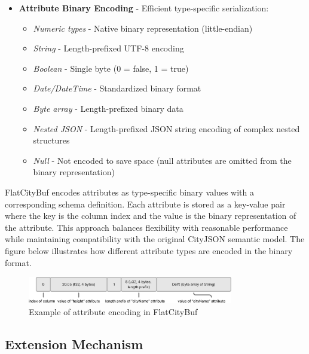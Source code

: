 \begin{itemize}
  \item \textbf{Attribute Binary Encoding} - Efficient type-specific serialization:
    \begin{itemize}
      \item \textit{Numeric types} - Native binary representation (little-endian)
      \item \textit{String} - Length-prefixed UTF-8 encoding
      \item \textit{Boolean} - Single byte (0 = false, 1 = true)
      \item \textit{Date/DateTime} - Standardized binary format
      \item \textit{Byte array} - Length-prefixed binary data
      \item \textit{Nested JSON} - Length-prefixed JSON string encoding of complex nested structures
      \item \textit{Null} - Not encoded to save space (null attributes are omitted from the binary representation)
    \end{itemize}
\end{itemize}

FlatCityBuf encodes attributes as type-specific binary values with a corresponding schema definition. Each attribute is stored as a key-value pair where the key is the column index and the value is the binary representation of the attribute. This approach balances flexibility with reasonable performance while maintaining compatibility with the original CityJSON semantic model. The figure below illustrates how different attribute types are encoded in the binary format.

\begin{figure}[htbp]
  \centering
  \includegraphics[width=0.8\textwidth]{figs/methodology/attribute_structure.png}
  \caption{Example of attribute encoding in FlatCityBuf}
  \label{methodology:feature_encoding:attribute_encoding:figure}
\end{figure}

\subsection{Extension Mechanism}
\label{methodology:feature_encoding:extension_mechanism}

